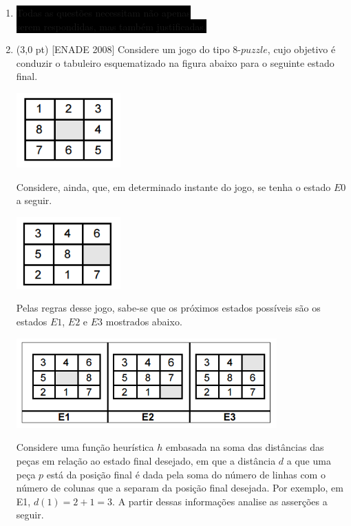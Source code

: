 \documentclass[12pt,a4paper,oneside]{article}
\begin{document}
\begin{enumerate}


	\item[] \colorbox{black}{
		\color{white}Todas as questões necessitam não apenas
	}\\ 
	\colorbox{black}{
		\color{white} serem respondidas, mas também justificadas.
	}
		\item (3,0 pt) [ENADE 2008] Considere um jogo do tipo 8-$puzzle$, cujo objetivo é conduzir o tabuleiro esquematizado na figura abaixo para o seguinte estado final. 
		
		\begin{center}
			\includegraphics[width=4cm]{images/enade01}
		\end{center}
		
		Considere, ainda, que, em determinado instante do jogo, se tenha o estado $E0$ a seguir.
		
		\begin{center}
			\includegraphics[width=4cm]{images/enade02}
		\end{center}
		
		Pelas regras desse jogo, sabe-se que os próximos estados possíveis são os estados $E1$, $E2$ e $E3$ mostrados abaixo.
		
		\begin{center}
			\includegraphics[width=10cm]{images/enade03}
		\end{center}
		
		Considere uma função heurística $h$ embasada na soma das distâncias das peças em relação ao estado final desejado,
		em que a distância $d$ a que uma peça $p$ está da posição final é dada pela soma do número de linhas com o número de colunas que a separam da posição final desejada. Por exemplo, em E1, $d(1) = 2 + 1 = 3$. A partir dessas informações analise as asserções a seguir.
		

\end{enumerate}
\end{document}
